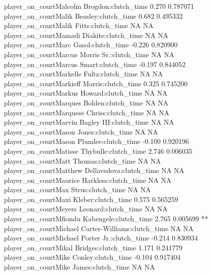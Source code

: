 \documentclass[
  landscape]{article}
\begin{document}
{player\_on\_courtMalcolm Brogdon:clutch\_time 0.270 0.787071\\
player\_on\_courtMalik Beasley:clutch\_time 0.682 0.495332\\
player\_on\_courtMalik Fitts:clutch\_time NA NA\\
player\_on\_courtMamadi Diakite:clutch\_time NA NA\\
player\_on\_courtMarc Gasol:clutch\_time -0.226 0.820900\\
player\_on\_courtMarcus Morris Sr.:clutch\_time NA NA\\
player\_on\_courtMarcus Smart:clutch\_time -0.197 0.844052\\
player\_on\_courtMarkelle Fultz:clutch\_time NA NA\\
player\_on\_courtMarkieff Morris:clutch\_time 0.325 0.745200\\
player\_on\_courtMarkus Howard:clutch\_time NA NA\\
player\_on\_courtMarques Bolden:clutch\_time NA NA\\
player\_on\_courtMarquese Chriss:clutch\_time NA NA\\
player\_on\_courtMarvin Bagley III:clutch\_time NA NA\\
player\_on\_courtMason Jones:clutch\_time NA NA\\
player\_on\_courtMason Plumlee:clutch\_time -0.100 0.920196\\
player\_on\_courtMatisse Thybulle:clutch\_time 2.746 0.006035 }
player\_on\_courtMatt Thomas:clutch\_time NA NA\\
player\_on\_courtMatthew Dellavedova:clutch\_time NA NA\\
player\_on\_courtMaurice Harkless:clutch\_time NA NA\\
player\_on\_courtMax Strus:clutch\_time NA NA\\
player\_on\_courtMaxi Kleber:clutch\_time 0.575 0.565259\\
player\_on\_courtMeyers Leonard:clutch\_time NA NA\\
player\_on\_courtMfiondu Kabengele:clutch\_time 2.765 0.005699 **
player\_on\_courtMichael Carter-Williams:clutch\_time NA NA\\
player\_on\_courtMichael Porter Jr.:clutch\_time -0.214 0.830934\\
player\_on\_courtMikal Bridges:clutch\_time 1.171 0.241779\\
player\_on\_courtMike Conley:clutch\_time -0.104 0.917404\\
player\_on\_courtMike James:clutch\_time NA NA\\
\end{document}
